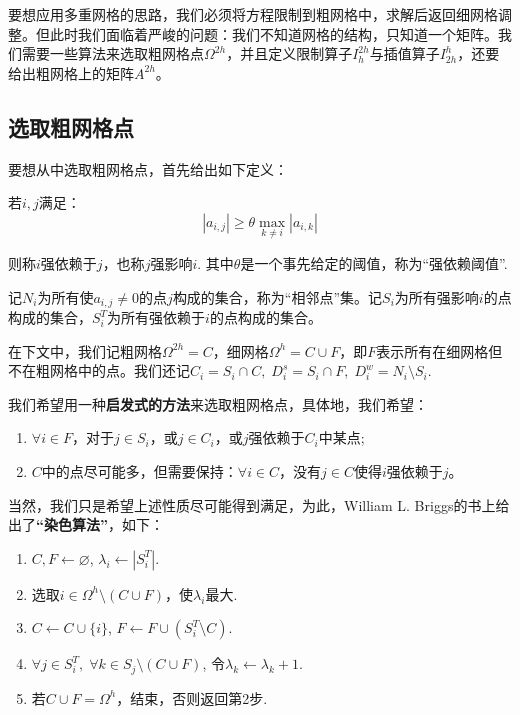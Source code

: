 \documentclass[lang=cn,10pt]{elegantbook}
\begin{document}
要想应用多重网格的思路，我们必须将方程限制到粗网格中，求解后返回细网格调整。但此时我们面临着严峻的问题：我们不知道网格的结构，只知道一个矩阵。我们需要一些算法来选取粗网格点$\Omega^{2h}$，并且定义限制算子$I_{h}^{2h}$与插值算子$I_{2h}^{h}$，还要给出粗网格上的矩阵$A^{2h}$。

\subsection{选取粗网格点}

要想从中选取粗网格点，首先给出如下定义：

\begin{definition}
  若$i,j$满足：
  \begin{equation}
    |a_{i,j}|\geq \theta\max_{k\neq i}|a_{i,k}|
  \end{equation}

  则称$i$强依赖于$j$，也称$j$强影响$i$. 其中$\theta$是一个事先给定的阈值，称为“强依赖阈值”.

  记$N_i$为所有使$a_{i,j}\neq 0$的点$j$构成的集合，称为“相邻点”集。记$S_i$为所有强影响$i$的点构成的集合，$S_i^T$为所有强依赖于$i$的点构成的集合。
\end{definition}

在下文中，我们记粗网格$\Omega^{2h}=C$，细网格$\Omega^h=C\cup F$，即$F$表示所有在细网格但不在粗网格中的点。我们还记$C_i=S_i\cap C,\;D_i^s=S_i\cap F,\;D_i^w=N_i\setminus S_i$.

我们希望用一种\textbf{启发式的方法}来选取粗网格点，具体地，我们希望：
\begin{enumerate}[(1)]
  \item $\forall i\in F$，对于$j\in S_i$，或$j\in C_i$，或$j$强依赖于$C_i$中某点;
  \item $C$中的点尽可能多，但需要保持：$\forall i\in C$，没有$j\in C$使得$i$强依赖于$j$。
\end{enumerate}

当然，我们只是希望上述性质尽可能得到满足，为此，William L. Briggs的书上给出了\textbf{“染色算法”}，如下：
\begin{enumerate}[1]
  \item $C,F\gets \varnothing$, $\lambda_i\gets |S_i^T|$.
  \item 选取$i\in\Omega^h\setminus(C\cup F)$，使$\lambda_i$最大.
  \item $C\gets C\cup\{i\}$, $F\gets F\cup (S_i^T\setminus C)$.
  \item $\forall j\in S_i^T,\;\forall k\in S_j\setminus(C\cup F)$, 令$\lambda_k\gets \lambda_k+1$.
  \item 若$C\cup F=\Omega^h$，结束，否则返回第2步.
\end{enumerate}
\end{document}
